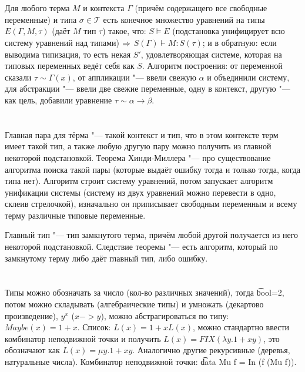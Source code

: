 \section{} %
Для любого терма $M$ и контекста $\Gamma$ (причём содержащего все свободные переменные) и типа $\sigma \in \mathcal T$
есть конечное множество уравнений на типы $E(\Gamma, M, \tau)$ (даёт $M$ тип $\tau$) такое, что:
$S \vDash E$ (подстановка унифицирует всю систему уравнений над типами) $\Rightarrow$ $S(\Gamma)\vdash M \colon S(\tau)$;
и в обратную: если выводима типизация, то есть некая $S'$, удовлетворяющая системе, которая на типовых переменных ведёт себя как $S$.
Алгоритм построения: от переменной сказали $\tau \sim \Gamma(x)$, от аппликации "--- ввели свежую $\alpha$ и объединили систему,
для абстракции "--- ввели две свежие переменные, одну в контекст, другую "--- как цель, добавили уравнение $\tau \sim \alpha \to \beta$.

\section{} %
Главная пара для тёрма "--- такой контекст и тип, что в этом контексте терм имеет такой тип,
а также любую другую пару можно получить из главной некоторой подстановкой.
Теорема Хинди-Миллера "--- про существование алгоритма поиска такой пары (которые выдаёт ошибку тогда и только тогда, когда типа нет).
Алгоритм строит систему уравнений, потом запускает алгоритм унификации системы (систему из двух уравнений можно перевести в одно,
склеив стрелочкой), изначально он приписывает свободным переменным и всему терму различные типовые переменные.

Главный тип "--- тип замкнутого терма, причём любой другой получается из него некоторой подстановкой.
Следствие теоремы "--- есть алгоритм, который по замкнутому терму либо даёт главный тип, либо ошибку.

\section{} %
Типы можно обозначать за число (кол-во различных значений), тогда \t{bool=2}, потом можно складывать (алгебраические типы)
и умножать (декартово произведение), $y^x$ ($x -> y$), можно абстрагироваться по типу: $Maybe(x)=1+x$.
Список: $L(x)=1+xL(x)$, можно стандартно ввести комбинатор неподвижной точки и получить $L(x)=FIX(\lambda y. 1+xy)$,
это обозначают как $L(x)=\mu y.1+xy$.
Аналогично другие рекурсивные (деревья, натуральные числа).
Комбинатор неподвижной точки: \t{data Mu f = In (f (Mu f))}.

